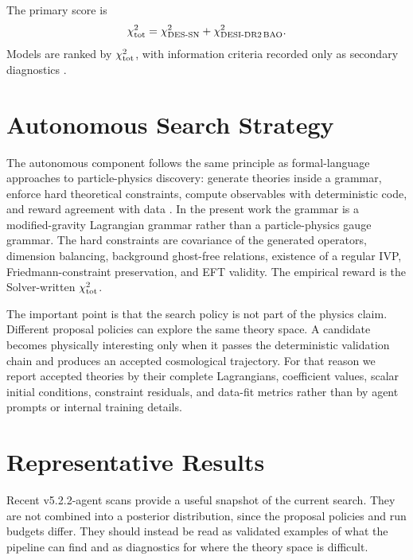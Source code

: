 \documentclass[aps,prd,twocolumn,superscriptaddress,nofootinbib,longbibliography]{revtex4-2}
\newcommand{\DES}{\mathrm{DES}}
\newcommand{\DESI}{\mathrm{DESI}}
\newcommand{\SN}{\mathrm{SN}}
\newcommand{\BAO}{\mathrm{BAO}}
\newcommand{\chiT}{\chi^2_{\rm tot}}
\begin{document}
The primary score is
\begin{equation}
\chiT=\chi^2_{\DES\text{-}\SN}+\chi^2_{\DESI\text{-DR2}\,\BAO}.
\label{eq:chi2}
\end{equation}
Models are ranked by $\chiT$, with information criteria recorded only as secondary diagnostics \cite{Akaike1974,Schwarz1978}.

\section{Autonomous Search Strategy}
\label{sec:search}

The autonomous component follows the same principle as formal-language approaches to particle-physics discovery: generate theories inside a grammar, enforce hard theoretical constraints, compute observables with deterministic code, and reward agreement with data \cite{Alexander2026Albert}.  In the present work the grammar is a modified-gravity Lagrangian grammar rather than a particle-physics gauge grammar.  The hard constraints are covariance of the generated operators, dimension balancing, background ghost-free relations, existence of a regular IVP, Friedmann-constraint preservation, and EFT validity.  The empirical reward is the Solver-written $\chiT$.

The important point is that the search policy is not part of the physics claim.  Different proposal policies can explore the same theory space.  A candidate becomes physically interesting only when it passes the deterministic validation chain and produces an accepted cosmological trajectory.  For that reason we report accepted theories by their complete Lagrangians, coefficient values, scalar initial conditions, constraint residuals, and data-fit metrics rather than by agent prompts or internal training details.

\section{Representative Results}
\label{sec:results}

Recent v5.2.2-agent scans provide a useful snapshot of the current search.  They are not combined into a posterior distribution, since the proposal policies and run budgets differ.  They should instead be read as validated examples of what the pipeline can find and as diagnostics for where the theory space is difficult.
\end{document}
